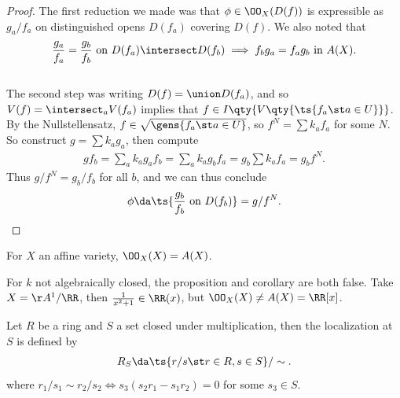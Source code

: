 \begin{proof}

The first reduction we made was that \(\phi \in \OO_X(D(f))\) is
expressible as \(g_a / f_a\) on distinguished opens \(D(f_a)\) covering
\(D(f)\). We also noted that
\begin{align*}
{g_a \over f_a} = {g_b \over f_b} \text{ on } D(f_a) \intersect D(f_b) \implies f_b g_a = f_a g_b \text{ in } A(X)
.\end{align*}\\

The second step was writing \(D(f) = \union D(f_a)\), and so
\(V(f) = \intersect_a V(f_a)\) implies that
\(f\in I\qty{ V\qty{ \ts{f_a \st a\in U} }}\). By the Nullstellensatz,
\(f\in \sqrt{\gens{f_a \st a\in U}}\), so \(f^N = \sum k_a f_a\) for
some \(N\). So construct \(g = \sum k_a g_a\), then compute
\begin{align*}  
gf_b = \sum_a k_a g_a f_b = \sum_a k_a g_b f_a = g_b \sum k_a f_a = g_b f^N
.\end{align*} Thus \(g/f^N = g_b / f_b\) for all \(b\), and we can thus
conclude
\begin{align*}  
\phi \da \ts{{g_b \over f_b} \text{ on } D(f_b)} = g/f^N
.\end{align*}

\end{proof}

\begin{corollary}[?]

For \(X\) an affine variety, \(\OO_X(X) = A(X)\).

\end{corollary}

\begin{warnings}

For \(k\) not algebraically closed, the proposition and corollary are
both false. Take \(X = \AA^1/\RR\), then \({1\over x^2+1} \in \RR(x)\),
but \(\OO_X(X) \neq A(X) = \RR[x]\).

\end{warnings}

\begin{definition}[Localization]

Let \(R\) be a ring and \(S\) a set closed under multiplication, then
the localization at \(S\) is defined by
\begin{align*}  
R_S \da \ts{r/s \st r\in R, s\in S} / \sim
.\end{align*} where
\(r_1/s_1 \sim r_2/s_2 \iff s_3(s_2 r_1 - s_1 r_2) = 0\) for some
\(s_3 \in S\).

\end{definition}

